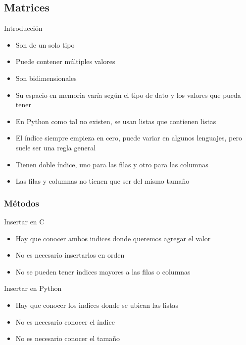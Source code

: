 \documentclass{beamer}
\newcommand{\Rplus}{\protect\hspace{-.1em}\protect\raisebox{.35ex}{\smaller{\smaller\textbf{+}}}}
\newcommand{\Cpp}{\mbox{C\Rplus\Rplus}\hspace{3pt}}
\begin{document}
\subsection{Matrices}
\begin{frame}{Introducci\'on}
	\begin{itemize}
		\item Son de un solo tipo
		\item Puede contener m\'ultiples valores
		\item Son bidimensionales
		\item Su espacio en memoria var\'ia seg\'un el tipo de dato y los valores que pueda tener
		\item En Python como tal no existen, se usan listas que contienen listas
		\item El \'indice siempre empieza en cero, puede variar en algunos lenguajes, pero suele ser una regla general
		\item Tienen doble índice, uno para las filas y otro para las columnas
		\item Las filas y columnas no tienen que ser del mismo tamaño
	\end{itemize}
\end{frame}

\subsubsection{M\'etodos}

\begin{frame}{Insertar en \Cpp}
	\begin{itemize}
		\item Hay que conocer ambos indices donde queremos agregar el valor
		\item No es necesario insertarlos en orden
		\item No se pueden tener indices mayores a las filas o columnas
	\end{itemize}
	\centering
\end{frame}

\begin{frame}{Insertar en Python}
	\begin{itemize}
		\item Hay que conocer los indices donde se ubican las listas
		\item No es necesario conocer el \'indice
		\item No es necesario conocer el tamaño 
	\end{itemize}
\end{frame}
\end{document}
